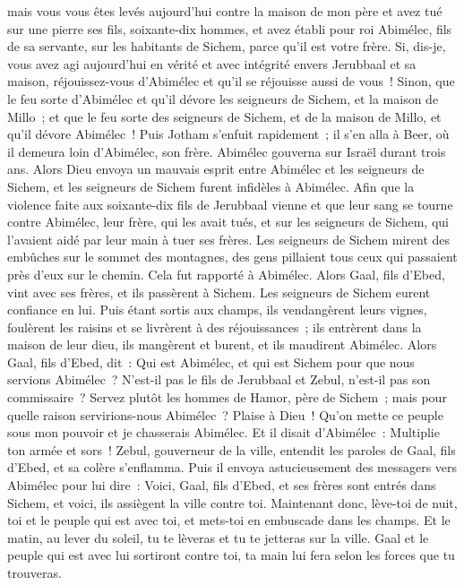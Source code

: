 \begin{multicols}{2}
mais vous vous êtes levés aujourd'hui contre la maison de mon père et avez tué sur une pierre ses fils, soixante-dix hommes, et avez établi pour roi Abimélec, fils de sa servante, sur les habitants de Sichem, parce qu'il est votre frère.
Si, dis-je, vous avez agi aujourd'hui en vérité et avec intégrité envers Jerubbaal et sa maison, réjouissez-vous d'Abimélec et qu'il se réjouisse aussi de vous~!
Sinon, que le feu sorte d'Abimélec et qu'il dévore les seigneurs de Sichem, et la maison de Millo~; et que le feu sorte des seigneurs de Sichem, et de la maison de Millo, et qu'il dévore Abimélec~!
Puis Jotham s'enfuit rapidement~; il s'en alla à Beer, où il demeura loin d'Abimélec, son frère.
Abimélec gouverna sur Israël durant trois ans.
Alors Dieu envoya un mauvais esprit entre Abimélec et les seigneurs de Sichem, et les seigneurs de Sichem furent infidèles à Abimélec.
Afin que la violence faite aux soixante-dix fils de Jerubbaal vienne et que leur sang se tourne contre Abimélec, leur frère, qui les avait tués, et sur les seigneurs de Sichem, qui l'avaient aidé par leur main à tuer ses frères.
Les seigneurs de Sichem mirent des embûches sur le sommet des montagnes, des gens pillaient tous ceux qui passaient près d'eux sur le chemin. Cela fut rapporté à Abimélec.
Alors Gaal, fils d'Ebed, vint avec ses frères, et ils passèrent à Sichem. Les seigneurs de Sichem eurent confiance en lui.
Puis étant sortis aux champs, ils vendangèrent leurs vignes, foulèrent les raisins et se livrèrent à des réjouissances~; ils entrèrent dans la maison de leur dieu, ils mangèrent et burent, et ils maudirent Abimélec.
Alors Gaal, fils d'Ebed, dit~: Qui est Abimélec, et qui est Sichem pour que nous servions Abimélec~? N'est-il pas le fils de Jerubbaal et Zebul, n'est-il pas son commissaire~? Servez plutôt les hommes de Hamor, père de Sichem~; mais pour quelle raison servirions-nous Abimélec~?
Plaise à Dieu~! Qu'on mette ce peuple sous mon pouvoir et je chasserais Abimélec. Et il disait d'Abimélec~: Multiplie ton armée et sors~!
Zebul, gouverneur de la ville, entendit les paroles de Gaal, fils d'Ebed, et sa colère s'enflamma.
Puis il envoya astucieusement des messagers vers Abimélec pour lui dire~: Voici, Gaal, fils d'Ebed, et ses frères sont entrés dans Sichem, et voici, ils assiègent la ville contre toi.
Maintenant donc, lève-toi de nuit, toi et le peuple qui est avec toi, et mets-toi en embuscade dans les champs.
Et le matin, au lever du soleil, tu te lèveras et tu te jetteras sur la ville. Gaal et le peuple qui est avec lui sortiront contre toi, ta main lui fera selon les forces que tu trouveras.

\end{multicols}
